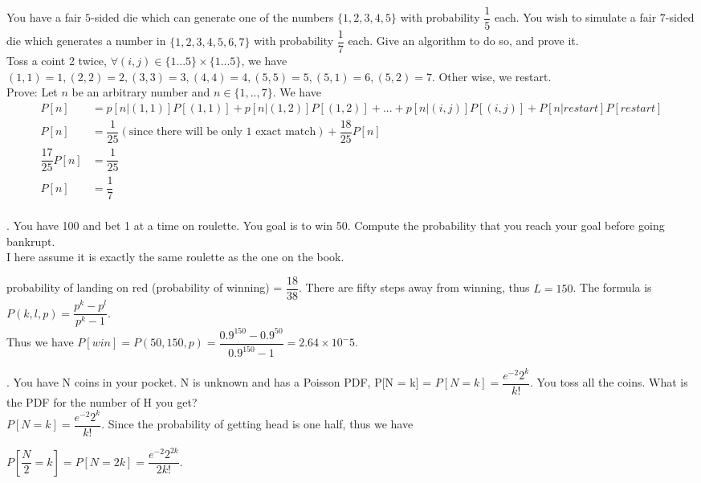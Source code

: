 \documentclass{article}
\begin{document}
\clearpage
\begin{addmargin}[2em]{2em}
You have a fair $5$-sided die which can generate one of the numbers $\{1, 2, 3, 4, 5\}$ with probability
$\dfrac{1}{5}$ each. You wish to simulate a fair $7$-sided die which generates a number in $\{1, 2, 3, 4, 5, 6, 7\}$ with probability $\dfrac{1}{7}$
each. Give an algorithm to do so, and prove it.\\

Toss a coint 2 twice, $\forall (i,j) \in \{1...5\}\times\{1...5\}$, we have $(1,1)=1,(2,2)=2,(3,3)=3,(4,4)=4,(5,5)=5,(5,1)=6,(5,2)=7$. Other wise, we restart.\\

Prove: Let $n$ be an arbitrary number and $n \in \{1,..,7\}$. We have 
\begin{align*}
	P[n]&=p[n|(1,1)]P[(1,1)]+p[n|(1,2)]P[(1,2)]+...+p[n|(i,j)]P[(i,j)]+P[n|restart]P[restart]\\
	P[n]&=\dfrac{1}{25}(\text{since there will be only 1 exact match}) + \dfrac{18}{25}P[n]\\
	\dfrac{17}{25}P[n]&=\dfrac{1}{25}\\
	P[n] &= \dfrac{1}{7}\\
\end{align*}
\end{addmargin}

\clearpage

\begin{addmargin}[2em]{2em}
. You have 100 and bet 1 at a time on roulette. You goal is to win 50. Compute the probability that you reach your goal before going bankrupt.\\

I here assume it is exactly the same roulette as the one on the book.

probability of landing on red (probability of winning) = $\dfrac{18}{38}$. There are fifty steps away from winning, thus $L=150$.
The formula is $P(k,l,p) = \dfrac{p^k-p^l}{p^k-1}$.\\
Thus we have $P[win] = P(50,150,p) = \dfrac{0.9^{150}-0.9^{50}}{0.9^{150}-1} = 2.64 \times 10^-5$.
\end{addmargin}
\newpage
\begin{addmargin}[2em]{2em}
	. You have N coins in your pocket. N is unknown and has a Poisson PDF, P[N = k] = $P[N = k] = \dfrac{e^{-2}2^k}{k!}$.
	You toss all the coins. What is the PDF for the number of H you get?\\
	
	$P[N = k] = \dfrac{e^{-2}2^k}{k!}$.
	Since the probability of getting head is one half, thus we have
	
	$P[\dfrac{N}{2} = k] = P[N=2k] = \dfrac{e^{-2}2^{2k}}{2k!}$.
\end{addmargin}
\end{document}
